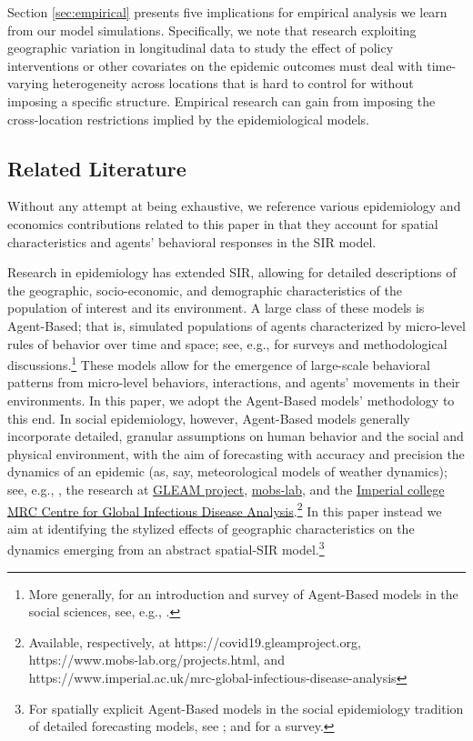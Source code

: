\documentclass[english,11pt]{article}
\begin{document}
Section \ref{sec:empirical} presents five implications for 
empirical analysis we learn from our model simulations. 
Specifically, we note that research exploiting geographic variation in longitudinal data 
to study the effect of policy interventions or other covariates on the epidemic
outcomes must deal with 
time-varying heterogeneity across locations that is hard to control 
for without imposing a specific structure. Empirical research can gain from 
imposing the cross-location restrictions implied by the epidemiological models.
 
\subsection{Related Literature}\label{sec:related}

Without any attempt at being exhaustive, we reference various epidemiology and economics contributions related to this paper in that they account for spatial characteristics and agents' behavioral responses in the SIR model. 

\label{epiresearch}Research in epidemiology has extended SIR, allowing for detailed descriptions of the geographic, socio-economic, and demographic characteristics of the population of interest and its environment. A large class of these models is Agent-Based; that is,  simulated populations of agents characterized by micro-level rules of behavior over time and space; see, e.g., \cite{el2012social, hunter2018comparison} for surveys and methodological discussions.\footnote{More generally, for an introduction and survey of Agent-Based models in the social sciences, see, e.g.,  \cite{billari2012agent, bruch2015agent}.} These models allow for the emergence of large-scale behavioral patterns from micro-level behaviors, interactions, and agents' movements in their environments. In this paper, we adopt the Agent-Based models' methodology to this end. In social epidemiology, however, Agent-Based models generally incorporate detailed, granular  assumptions on human behavior and the social and physical environment, with the aim of forecasting with accuracy and precision the dynamics of an epidemic (as, say, meteorological models of weather dynamics); see, e.g., \cite{eubank2004modelling}, 
the research at  \href{https://covid19.gleamproject.org}{GLEAM project}, 
\href{https://www.mobs-lab.org/projects.html}{mobs-lab}, and the  \href{https://www.imperial.ac.uk/mrc-global-infectious-disease-analysis}{Imperial college MRC Centre for Global Infectious Disease Analysis}.\footnote{Available, respectively, at https://covid19.gleamproject.org, https://www.mobs-lab.org/projects.html, and https://www.imperial.ac.uk/mrc-global-infectious-disease-analysis}  In this paper instead we aim at identifying the stylized effects of geographic characteristics on the dynamics emerging from an abstract spatial-SIR  model.\footnote{For spatially explicit  Agent-Based models in the social epidemiology tradition of detailed forecasting models, see
\cite{dunham2005agent, grefenstette2013fred}; and \cite{hunter2017taxonomy} for a survey.} 
\end{document}
